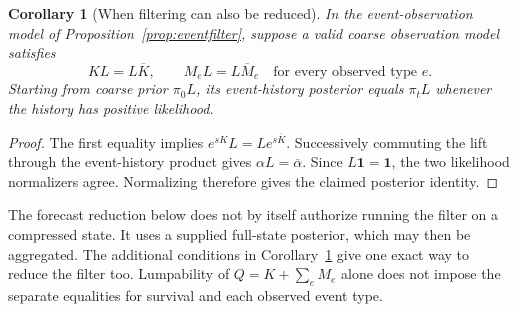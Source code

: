 \documentclass[11pt]{article}
\theoremstyle{plain}
\newtheorem{corollary}[theorem]{Corollary}
\theoremstyle{definition}
\theoremstyle{remark}
\begin{document}
\begin{corollary}[When filtering can also be reduced]
\label{cor:filterreduction}
In the event-observation model of Proposition~\ref{prop:eventfilter},
suppose a valid coarse observation model satisfies
\[
 KL=L\overline K,\qquad M_eL=L\overline M_e
 \quad\text{for every observed type }e.
\]
Starting from coarse prior \(\pi_0L\), its event-history posterior
equals \(\pi_tL\) whenever the history has positive likelihood.
\end{corollary}
\begin{proof}
The first equality implies \(e^{sK}L=Le^{s\overline K}\).
Successively commuting the lift through the event-history product
gives \(\alpha L=\overline\alpha\). Since
\(L\mathbf1=\mathbf1\), the two likelihood normalizers agree.
Normalizing therefore gives the claimed posterior identity.
\end{proof}

The forecast reduction below does not by itself authorize running
the filter on a compressed state. It uses a supplied full-state
posterior, which may then be aggregated. The additional conditions in
Corollary~\ref{cor:filterreduction} give one exact way to reduce the
filter too. Lumpability of \(Q=K+\sum_eM_e\) alone does not impose
the separate equalities for survival and each observed event type.
\end{document}
